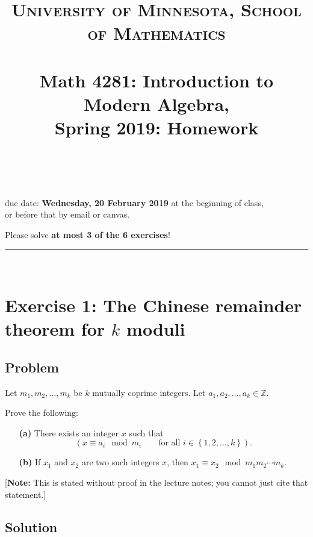 \documentclass[paper=a4, fontsize=12pt]{scrartcl} %
\title{	
\normalfont \normalsize 
\textsc{University of Minnesota, School of Mathematics} \\ [25pt] %
\horrule{0.5pt} \\[0.4cm] %
\huge Math 4281: Introduction to Modern Algebra, \\
Spring 2019:
Homework \psetnumber\\%
\horrule{2pt} \\[0.5cm] %
}
\author{\myname}
\newcommand{\ZZ}{\mathbb{Z}} %
\newcommand{\set}[1]{\left\{ #1 \right\}}
\newcommand{\tup}[1]{\left( #1 \right)}
\newcommand{\horrule}[1]{\rule{\linewidth}{#1}} %
\theoremstyle{plainsl}
\theoremstyle{definition}
\theoremstyle{remark}
\begin{document}
\maketitle %

\begin{center} %
{\large due date: \textbf{Wednesday, 20 February 2019} at the beginning of class, \\
or before that by email or canvas.

Please solve \textbf{at most 3 of the 6 exercises}!}
\end{center}

\horrule{0.3pt} \\[0.4cm]

\section{Exercise 1: The Chinese remainder theorem for $k$ moduli}

\subsection{Problem}

Let $m_1, m_2, \ldots, m_k$ be $k$ mutually coprime integers.
Let $a_1, a_2, \ldots, a_k \in \ZZ$.

Prove the following:

\begin{enumerate}

\item[\textbf{(a)}]
There exists an integer $x$ such that
\[
\tup{ x \equiv a_i \mod m_i \qquad \text{for all } i \in \set{1, 2, \ldots, k} } .
\]

\item[\textbf{(b)}]
If $x_1$ and $x_2$ are two such integers $x$, then
$x_1 \equiv x_2 \mod m_1 m_2 \cdots m_k$.

\end{enumerate}

[\textbf{Note:} This is stated without proof in the lecture notes;
you cannot just cite that statement.]

\subsection{Solution}
\end{document}
